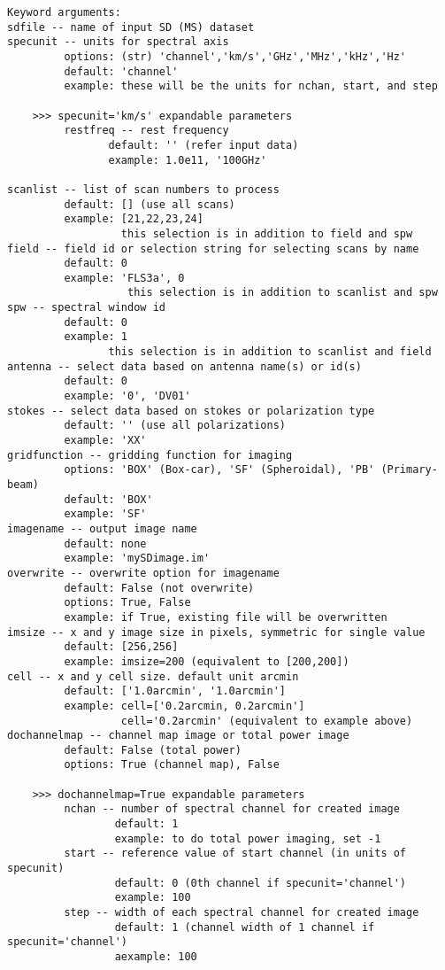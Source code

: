 \begin{verbatim}
Keyword arguments:
sdfile -- name of input SD (MS) dataset
specunit -- units for spectral axis
         options: (str) 'channel','km/s','GHz','MHz','kHz','Hz'
         default: 'channel'
         example: these will be the units for nchan, start, and step
    
    >>> specunit='km/s' expandable parameters
         restfreq -- rest frequency
                default: '' (refer input data)
                example: 1.0e11, '100GHz'

scanlist -- list of scan numbers to process
         default: [] (use all scans)
         example: [21,22,23,24]
                  this selection is in addition to field and spw
field -- field id or selection string for selecting scans by name
         default: 0
         example: 'FLS3a', 0
                   this selection is in addition to scanlist and spw
spw -- spectral window id
         default: 0
         example: 1
                this selection is in addition to scanlist and field
antenna -- select data based on antenna name(s) or id(s)
         default: 0
         example: '0', 'DV01'
stokes -- select data based on stokes or polarization type 
         default: '' (use all polarizations)
         example: 'XX'
gridfunction -- gridding function for imaging
         options: 'BOX' (Box-car), 'SF' (Spheroidal), 'PB' (Primary-beam)
         default: 'BOX'
         example: 'SF'
imagename -- output image name
         default: none
         example: 'mySDimage.im'
overwrite -- overwrite option for imagename
         default: False (not overwrite)
         options: True, False
         example: if True, existing file will be overwritten
imsize -- x and y image size in pixels, symmetric for single value
         default: [256,256]
         example: imsize=200 (equivalent to [200,200])
cell -- x and y cell size. default unit arcmin
         default: ['1.0arcmin', '1.0arcmin']
         example: cell=['0.2arcmin, 0.2arcmin']
                  cell='0.2arcmin' (equivalent to example above)
dochannelmap -- channel map image or total power image
         default: False (total power)
         options: True (channel map), False

    >>> dochannelmap=True expandable parameters
         nchan -- number of spectral channel for created image
                 default: 1 
                 example: to do total power imaging, set -1 
         start -- reference value of start channel (in units of specunit)
                 default: 0 (0th channel if specunit='channel')
                 example: 100
         step -- width of each spectral channel for created image
                 default: 1 (channel width of 1 channel if specunit='channel')
                 aexample: 100


\end{verbatim}
